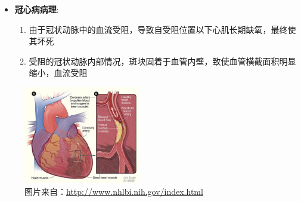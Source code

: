 \begin{frame}
\begin{itemize}
  \item \textbf{冠心病病理}: 
  \begin{enumerate}[A]
    \item 由于冠状动脉中的血流受阻，导致自受阻位置以下心肌长期缺氧，最终使其坏死
    \item 受阻的冠状动脉内部情况，斑块固着于血管内壁，致使血管横截面积明显缩小，血流受阻
  \end{enumerate}
\end{itemize}
\begin{figure}[t]
\centering
\includegraphics[height=120pt]{../../Figures/background/heart_attack_large.eps}
\caption[冠心病病理]{图片来自：\url{http://www.nhlbi.nih.gov/index.html}}
\end{figure}
\end{frame}

